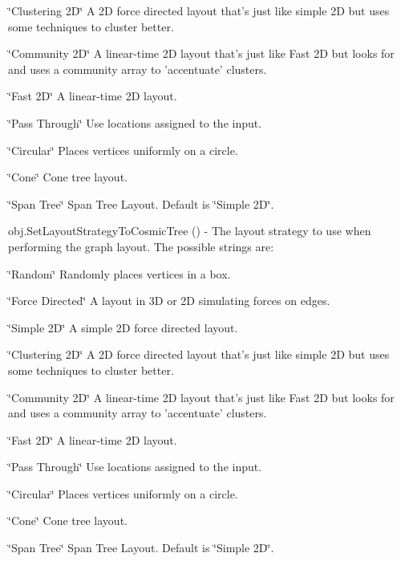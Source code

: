 \begin{DoxyItemize}
\begin{DoxyItemize}
\item \char`\"{}\-Clustering 2\-D\char`\"{} A 2\-D force directed layout that's just like simple 2\-D but uses some techniques to cluster better.
\item \char`\"{}\-Community 2\-D\char`\"{} A linear-\/time 2\-D layout that's just like Fast 2\-D but looks for and uses a community array to 'accentuate' clusters.
\item \char`\"{}\-Fast 2\-D\char`\"{} A linear-\/time 2\-D layout.
\item \char`\"{}\-Pass Through\char`\"{} Use locations assigned to the input.
\item \char`\"{}\-Circular\char`\"{} Places vertices uniformly on a circle.
\item \char`\"{}\-Cone\char`\"{} Cone tree layout.
\item \char`\"{}\-Span Tree\char`\"{} Span Tree Layout. Default is \char`\"{}\-Simple 2\-D\char`\"{}.  
\end{DoxyItemize}
\item {\ttfamily obj.\-Set\-Layout\-Strategy\-To\-Cosmic\-Tree ()} -\/ The layout strategy to use when performing the graph layout. The possible strings are\-:
\begin{DoxyItemize}
\item \char`\"{}\-Random\char`\"{} Randomly places vertices in a box.
\item \char`\"{}\-Force Directed\char`\"{} A layout in 3\-D or 2\-D simulating forces on edges.
\item \char`\"{}\-Simple 2\-D\char`\"{} A simple 2\-D force directed layout.
\item \char`\"{}\-Clustering 2\-D\char`\"{} A 2\-D force directed layout that's just like simple 2\-D but uses some techniques to cluster better.
\item \char`\"{}\-Community 2\-D\char`\"{} A linear-\/time 2\-D layout that's just like Fast 2\-D but looks for and uses a community array to 'accentuate' clusters.
\item \char`\"{}\-Fast 2\-D\char`\"{} A linear-\/time 2\-D layout.
\item \char`\"{}\-Pass Through\char`\"{} Use locations assigned to the input.
\item \char`\"{}\-Circular\char`\"{} Places vertices uniformly on a circle.
\item \char`\"{}\-Cone\char`\"{} Cone tree layout.
\item \char`\"{}\-Span Tree\char`\"{} Span Tree Layout. Default is \char`\"{}\-Simple 2\-D\char`\"{}.  

\end{DoxyItemize}
\end{DoxyItemize}
